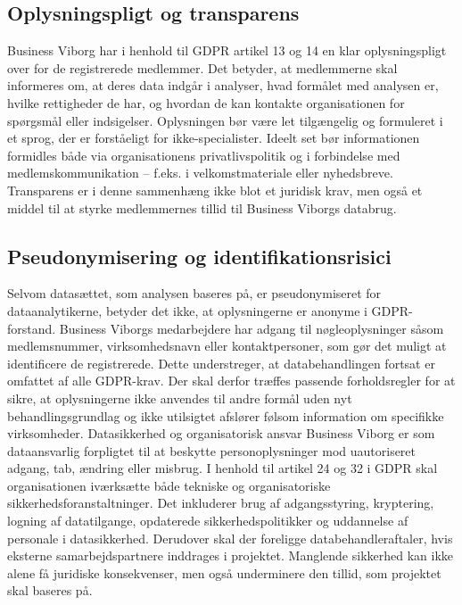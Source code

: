 \documentclass[
  11pt,
  letterpaper,
  DIV=11,
  numbers=noendperiod]{scrartcl}
\begin{document}
\subsection{Oplysningspligt og
transparens}\label{oplysningspligt-og-transparens}

Business Viborg har i henhold til GDPR artikel 13 og 14 en klar
oplysningspligt over for de registrerede medlemmer. Det betyder, at
medlemmerne skal informeres om, at deres data indgår i analyser, hvad
formålet med analysen er, hvilke rettigheder de har, og hvordan de kan
kontakte organisationen for spørgsmål eller indsigelser. Oplysningen bør
være let tilgængelig og formuleret i et sprog, der er forståeligt for
ikke-specialister. Ideelt set bør informationen formidles både via
organisationens privatlivspolitik og i forbindelse med
medlemskommunikation -- f.eks. i velkomstmateriale eller nyhedsbreve.
Transparens er i denne sammenhæng ikke blot et juridisk krav, men også
et middel til at styrke medlemmernes tillid til Business Viborgs
databrug.

\subsection{Pseudonymisering og
identifikationsrisici}\label{pseudonymisering-og-identifikationsrisici}

Selvom datasættet, som analysen baseres på, er pseudonymiseret for
dataanalytikerne, betyder det ikke, at oplysningerne er anonyme i
GDPR-forstand. Business Viborgs medarbejdere har adgang til
nøgleoplysninger såsom medlemsnummer, virksomhedsnavn eller
kontaktpersoner, som gør det muligt at identificere de registrerede.
Dette understreger, at databehandlingen fortsat er omfattet af alle
GDPR-krav. Der skal derfor træffes passende forholdsregler for at sikre,
at oplysningerne ikke anvendes til andre formål uden nyt
behandlingsgrundlag og ikke utilsigtet afslører følsom information om
specifikke virksomheder. Datasikkerhed og organisatorisk ansvar Business
Viborg er som dataansvarlig forpligtet til at beskytte personoplysninger
mod uautoriseret adgang, tab, ændring eller misbrug. I henhold til
artikel 24 og 32 i GDPR skal organisationen iværksætte både tekniske og
organisatoriske sikkerhedsforanstaltninger. Det inkluderer brug af
adgangsstyring, kryptering, logning af datatilgange, opdaterede
sikkerhedspolitikker og uddannelse af personale i datasikkerhed.
Derudover skal der foreligge databehandleraftaler, hvis eksterne
samarbejdspartnere inddrages i projektet. Manglende sikkerhed kan ikke
alene få juridiske konsekvenser, men også underminere den tillid, som
projektet skal baseres på.
\end{document}
